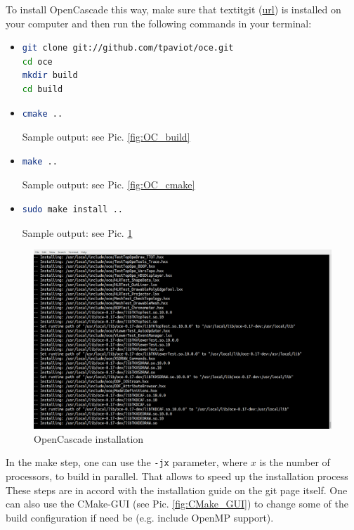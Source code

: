 \documentclass[11pt,a4paper,article,bibtotoc,idxtotoc,headsepline,footsepline,footexclude,DIV13,oneside]{scrbook}
\begin{document}
To install OpenCascade this way, make sure that textit{git} (\href{https://git-scm.com/}{url}) is installed on your computer and then run the following commands in your terminal:
\begin{itemize}
\item \begin{lstlisting}[language=bash]
git clone git://github.com/tpaviot/oce.git
cd oce
mkdir build
cd build
\end{lstlisting}
	
\item 
\begin{lstlisting}[language=bash]
cmake .. 
\end{lstlisting}	
Sample output: see Pic. \ref{fig:OC_build}
\item 
\begin{lstlisting}[language=bash]
make .. 
\end{lstlisting}	
Sample output: see Pic. \ref{fig:OC_cmake}
\item 
\begin{lstlisting}[language=bash]
sudo make install .. 
\end{lstlisting}	
Sample output: see Pic. \ref{fig:OC_install}
\end{itemize}

\begin{figure}
\centering
\includegraphics[scale=0.3]{img/OC_Install2.png}
\caption{OpenCascade installation}
\label{fig:OC_install}
\end{figure}
	In the make step, one can use the \texttt{-jx} parameter, where $x$ is the number of processors, to build in parallel. That allows to speed up the installation process These steps are in accord with the installation guide on the git page itself. One can also use the CMake-GUI (see Pic. \ref{fig:CMake_GUI}) to change some of the build configuration if need be (e.g. include OpenMP support).
	
\end{document}
